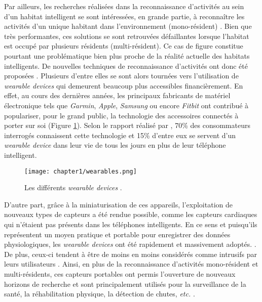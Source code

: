 {{Par ailleurs, les recherches réalisées dans la reconnaissance d'activités au sein d'un habitat intelligent se sont intéressées, en grande partie, à reconnaître les activités d'un unique habitant dans l'environnement (mono-résident) \citep{VikramadityaJakkula2007, VanKasteren2008, Inomata2009, Ghazvininejad2011, Belley2014, Fortin-Simard2015}. Bien que très performantes, ces solutions se sont retrouvées défaillantes lorsque l'habitat est occupé par plusieurs résidents (multi-résident). Ce cas de figure constitue pourtant une problématique bien plus proche de la réalité actuelle des habitats intelligents. De nouvelles techniques de reconnaissance d'activités ont donc été proposées \citep{Crandall2009, Cook2009, Alemdar2013, Ayuningtyas2014, Emi2015, Mokhtari2018}. Plusieurs d'entre elles \citep{Mihailidis2004, Tunca2014} se sont alors tournées vers l'utilisation de \textit{wearable devices} qui demeurent beaucoup plus accessibles financièrement. En effet, au cours des dernières années, les principaux fabricants de matériel électronique tels que \textit{Garmin}, \textit{Apple}, \textit{Samsung} ou encore \textit{Fitbit} ont contribué à populariser, pour le grand public, la technologie des accessoires connectés à porter sur soi (Figure \ref{fig:wearables}). Selon le rapport réalisé par \cite{Nielsen2014}, 70\% des consommateurs interrogés connaissent cette technologie et 15\% d'entre eux se servent d'un \textit{wearable device} dans leur vie de tous les jours en plus de leur téléphone intelligent.

\begin{figure}[H]
	\centering
	\texttt{[image: chapter1/wearables.png]}
	\caption[Les différents \textit{wearable devices}.]{Les différents \textit{wearable devices} \citep{Huifeng2020}.}
	\label{fig:wearables}
\end{figure}

D'autre part, grâce à la miniaturisation de ces appareils, l'exploitation de nouveaux types de capteurs a été rendue possible, comme les capteurs cardiaques qui n'étaient pas présents dans les téléphones intelligents. En ce sens et puisqu'ils représentent un moyen pratique et portable pour enregistrer des données physiologiques, les \textit{wearable devices} ont été rapidement et massivement adoptés. \citep{NPDGroup2015}. De plus, ceux-ci tendent à être de moins en moins considérés comme intrusifs par leurs utilisateurs \citep{Gaskin2017}. Ainsi, en plus de la reconnaissance d'activités mono-résident et multi-résidents, ces capteurs portables ont permis l'ouverture de nouveaux horizons de recherche et sont principalement utilisés pour la surveillance de la santé, la réhabilitation physique, la détection de chutes, \textit{etc.} \citep{Patel2012, Mukhopadhyay2014, Delahoz2014}.

}}
